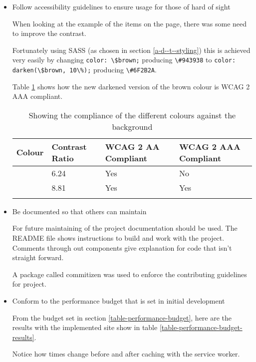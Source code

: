 \begin{itemize}
  \item Follow accessibility guidelines to ensure usage for those of hard of sight

    When looking at the example of the items on the page, there was some need to improve the contrast.

    Fortunately using SASS (as chosen in section \ref{a-d--t--styling}) this is achieved very easily by changing \verb|color: \$brown;| producing \verb|\#943938| to \verb|color: darken(\$brown, 10\%);| producing \verb|\#6F2B2A|.

    Table \ref{table-contrast-changes} shows how the new darkened version of the brown colour is WCAG 2 AAA compliant.

    \begin{table}[H]
    \centering
    \begin{tabular}{|l|l|l|l|}
    \hline
    \textbf{Colour} & \textbf{Contrast Ratio} & \textbf{WCAG 2 AA Compliant} & \textbf{WCAG 2 AAA Compliant} \\ \hline
    \cellcolor[HTML]{943938}{\textbf{\textcolor{white}{\#943938}}} & 6.24 & Yes & No \\ \hline
    \cellcolor[HTML]{6F2B2A}{\textbf{\textcolor{white}{\#6F2B2A}}} & 8.81 & Yes & Yes \\ \hline
    \caption{Showing the compliance of the different colours against the background}
    \label{table-contrast-changes}
    \end{tabular}
    \end{table}

  \item Be documented so that others can maintain

    For future maintaining of the project documentation should be used. The README file shows instructions to build and work with the project. Comments through out components give explanation for code that isn't straight forward.

    A package called commitizen was used to enforce the contributing guidelines for project. \cite{commitizen}

  \item Conform to the performance budget that is set in initial development

    From the budget set in section \ref{table-performance-budget}, here are the results with the implemented site show in table \ref{table-performance-budget-results}.

    Notice how times change before and after caching with the service worker.


\end{itemize}

